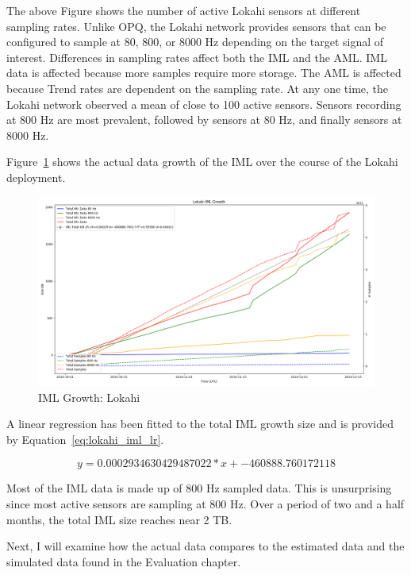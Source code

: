 The above Figure shows the number of active Lokahi sensors at different sampling rates. Unlike OPQ, the Lokahi network provides sensors that can be configured to sample at 80, 800, or 8000 Hz depending on the target signal of interest. Differences in sampling rates affect both the IML and the AML. IML data is affected because more samples require more storage. The AML is affected because Trend rates are dependent on the sampling rate. At any one time, the Lokahi network observed a mean of close to 100 active sensors. Sensors recording at 800 Hz are most prevalent, followed by sensors at 80 Hz, and finally sensors at 8000 Hz.

Figure~\ref{fig:lokahi_actual_iml} shows the actual data growth of the IML over the course of the Lokahi deployment.

\begin{figure}[H]
    \centering
    \includegraphics[width=\linewidth]{figures/lokahi_actual_iml.png}
    \caption{IML Growth: Lokahi}
    \label{fig:lokahi_actual_iml}
\end{figure}

A linear regression has been fitted to the total IML growth size and is provided by Equation~\ref{eq:lokahi_iml_lr}.

\begin{equation}
    y = 0.0002934630429487022 * x + -460888.760172118
    \label{eq:lokahi_iml_lr}
\end{equation}

Most of the IML data is made up of 800 Hz sampled data. This is unsurprising since most active sensors are sampling at 800 Hz. Over a period of two and a half months, the total IML size reaches near 2 TB.

Next, I will examine how the actual data compares to the estimated data and the simulated data found in the Evaluation chapter.

